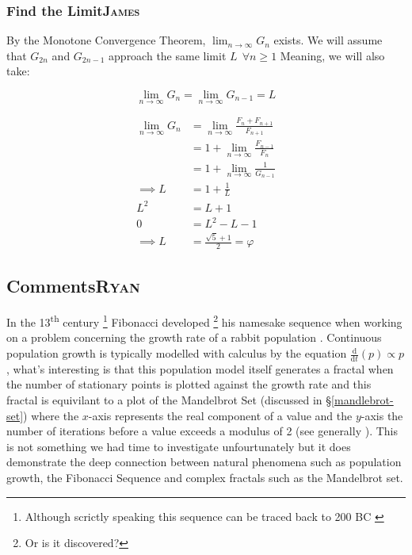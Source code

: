 \documentclass[a4paper,11pt,twoside]{article}
\begin{document}
\subsubsection{Find the Limit\hfill{}\textsc{James}}
\label{sec:org5049831}
By the Monotone Convergence Theorem, \(\lim_{n \to \infty} G_n\) exists.
We will assume that \(G_{2n}\) and \(G_{2n-1}\) approach the same limit \(L~~\forall n \ge 1\)
Meaning, we will also take:

\begin{equation*}
    \lim_{n\to \infty}G_n = \lim_{n\to \infty}G_{n-1} = L
\end{equation*}

\begin{align*}
\lim_{n\to \infty}G_n &= \lim_{n \to \infty} \frac{F_{n} +  F_{n+  1} }{F_{n+  1} } \\
&= 1 +  \lim_{n \to \infty} \frac{F_{n- 1} }{F_n} \\
&=  1 +  \lim_{n \to \infty}\frac{1}{G_{n-1}} \\
 \implies L &= 1 + \frac{1}{L}\\
 L^2 &= L + 1\\
 0 &= L^2 - L - 1\\
  \implies  L &= \frac{\sqrt{5} + 1  }{2} = \varphi
\end{align*}
\subsection{Comments\hfill{}\textsc{Ryan}}
\label{comment}
In the 13\textsuperscript{th} century \footnote{Although scrictly speaking this sequence can be traced back to 200 BC \cite{prasadHowFibonacciNumber2018,brownHistoryApplicationsFibonacci2019}} Fibonacci developed \footnote{Or is it discovered?}  his namesake sequence when working on a problem concerning the growth rate
of a rabbit population \cite{ronknottFibonacciNumbersGolden2016}.
Continuous population growth is typically modelled with calculus by the equation \(\frac{\mathrm{d} }{\mathrm{d} t}\left( p \right)
\propto p\) \cite[\S 11.1]{giordanoFirstCourseMathematical2014}, what's interesting is that this population model itself
generates a fractal when the number of stationary points is plotted against the
growth rate \cite[Ch. 3]{briggsTurbulentMirrorIllustrated1989}
and this fractal is equivilant to a plot of the Mandelbrot Set (discussed in \S \ref{mandlebrot-set}) where the \(x\)-axis represents the real component of a value and the \(y\)-axis the number of iterations before a value exceeds a modulus of 2 (see generally \cite{mullerThisEquationWill2020}). This is not
something we had time to investigate unfourtunately but it does demonstrate the deep connection between natural phenomena such as population growth, the Fibonacci Sequence and complex fractals such as the Mandelbrot set.
\end{document}
